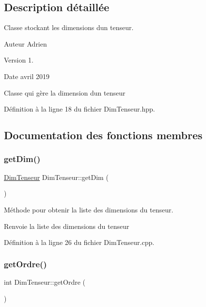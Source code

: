 \subsection{Description détaillée}
Classe stockant les dimensions d\textquotesingle{}un tenseur. 

\begin{DoxyAuthor}{Auteur}
Adrien 
\end{DoxyAuthor}
\begin{DoxyVersion}{Version}
1. 
\end{DoxyVersion}
\begin{DoxyDate}{Date}
avril 2019
\end{DoxyDate}
Classe qui gère la dimension d\textquotesingle{}un tenseur 

Définition à la ligne 18 du fichier Dim\+Tenseur.\+hpp.



\subsection{Documentation des fonctions membres}
\mbox{\label{class_dim_tenseur_a987995f83a0c8debb5f75edb59dad3b0}} 
\subsubsection{\texorpdfstring{get\+Dim()}{getDim()}}
{\footnotesize\ttfamily \hyperlink{class_dim_tenseur}{Dim\+Tenseur} Dim\+Tenseur\+::get\+Dim (\begin{DoxyParamCaption}{ }\end{DoxyParamCaption})}



Méthode pour obtenir la liste des dimensions du tenseur. 

\begin{DoxyReturn}{Renvoie}
la liste des dimensions du tenseur 
\end{DoxyReturn}


Définition à la ligne 26 du fichier Dim\+Tenseur.\+cpp.

\mbox{\label{class_dim_tenseur_a0d1e2833c775440baad2ac390cc6e135}} 
\subsubsection{\texorpdfstring{get\+Ordre()}{getOrdre()}}
{\footnotesize\ttfamily int Dim\+Tenseur\+::get\+Ordre (\begin{DoxyParamCaption}{ }\end{DoxyParamCaption})}



